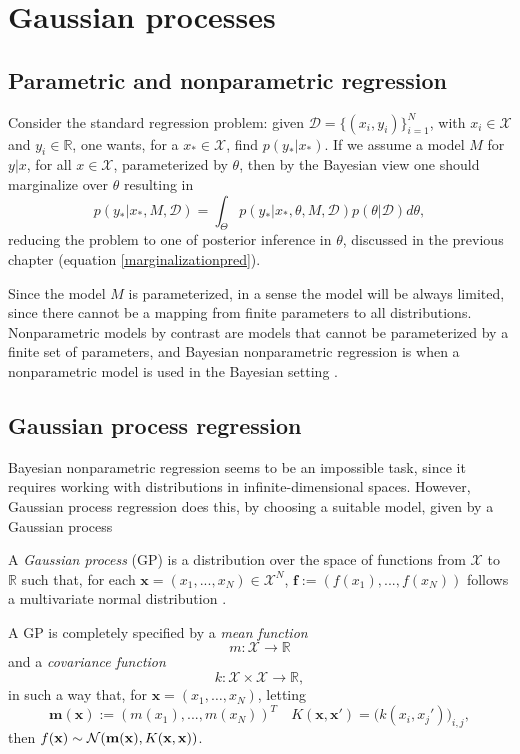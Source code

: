 \chapter{Gaussian processes}

\section{Parametric and nonparametric regression}
Consider the standard regression problem: given $\mathcal{D} = \{(x_i,y_i)\}_{i=1}^N$, with $x_i \in \mathcal{X}$ and $y_i \in \mathbb{R}$, one wants, for a $x_* \in \mathcal{X}$, find $p(y_*|x_*)$. If we assume a model $M$ for $y|x$, for all $x \in \mathcal{X}$, parameterized by $\theta$, then by the Bayesian view one should marginalize over $\theta$ resulting in 
\begin{equation}
 p(y_*|x_*,M,\mathcal{D}) = \int_{\Theta} p(y_*|x_*,\theta,M,\mathcal{D}) p(\theta|\mathcal{D}) d\theta,
\end{equation}
reducing the problem to one of posterior inference in $\theta$, discussed in the previous chapter (equation \eqref{marginalizationpred}).

Since the model $M$ is parameterized, in a sense the model will be always limited, since there cannot be a mapping from finite parameters to all distributions. Nonparametric models by contrast are models that cannot be parameterized by a finite set of parameters, and Bayesian nonparametric regression is when a nonparametric model is used in the Bayesian setting \cite{Ghahramani_2013,Hjort_2010}. 

\section{Gaussian process regression}
Bayesian nonparametric regression seems to be an impossible task, since it requires working with distributions in infinite-dimensional spaces. However, Gaussian process regression \cite{Rasmussen06} does this, by choosing a suitable model, given by a Gaussian process
\begin{Definition}
	A \textit{Gaussian process} (GP) is a distribution over the space of functions from $\mathcal{X}$ to $\mathbb{R}$ such that, for each $\mathbf{x} = (x_1,...,x_N) \in \mathcal{X}^N$, $\mathbf{f} := (f(x_1),...,f(x_N))$ follows a multivariate normal distribution \cite{Rasmussen06}. 
\end{Definition}

A GP is completely specified by a \textit{mean function}
\begin{displaymath}
m : \mathcal{X} \to \mathbb{R}
\end{displaymath}
and a \textit{covariance function} 
\begin{displaymath}
k : \mathcal{X} \times \mathcal{X} \to \mathbb{R},
\end{displaymath}
in such a way that, for $\mathbf{x} = (x_1,\ldots,x_N)$, letting
\begin{equation}
\mathbf{m}(\mathbf{x}) := (m(x_1),...,m(x_N))^T \quad K(\mathbf{x},\mathbf{x}') = \bigg(k(x_i,x_j')\bigg)_{i,j},
\end{equation}
then $f(\mathbf{x}) \sim \mathcal{N}(\mathbf{m}(\mathbf{x}),K({\mathbf x},{\mathbf x}))$. 

